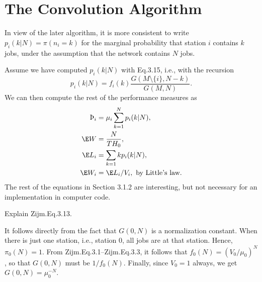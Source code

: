 
\section{The Convolution Algorithm}
\label{sec:convolution}

In view of the later algorithm, it is more consistent to write
$p_i(k|N)=\pi(n_i=k)$ for the marginal probability that station $i$
contains $k$ jobs, under the assumption that the network contains $N$
jobs. 

Assume we have computed  $p_i(k|N)$  with Eq.3.15, i.e., with the recursion
\begin{equation*}
  p_i(k|N) = f_i(k)\frac{G(M\setminus\{i\}, N-k)}{G(M,N)}.
\end{equation*}
We can then compute the rest of the performance measures as 
\begin{align*}
  \TH_i &= \mu_i\sum_{k=1}^N p_i(k|N), \\
  \E W &= \frac{N}{TH_0}, \\
\E L_i &= \sum_{k=1} k p_i(k|N), \\
\E W_i &= \E L_i / V_i, \text{ by Little's law}. \\
\end{align*}
The rest of the equations in Section 3.1.2 are interesting, but not
necessary for an implementation in computer code. 

\begin{question}
  Explain Zijm.Eq.3.13.
  \begin{solution}
    It follows directly from the fact that $G(0,N)$ is a normalization
    constant. When there is just one station, i.e., station 0, all jobs are at that station. Hence, $\pi_0(N)=1$. From Zijm.Eq.3.1--Zijm.Eq.3.3, it follows that $f_0(N)=(V_0/\mu_0)^N$, so that $G(0,N)$ must be $1/f_0(N)$. Finally, since $V_0=1$ always, we get $G(0,N)=\mu_0^{-N}$.
  \end{solution}
\end{question}

